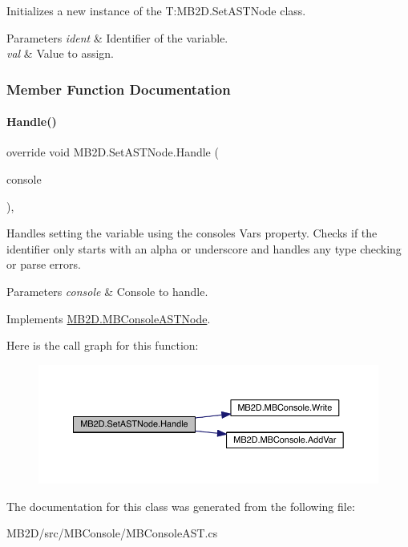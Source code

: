 Initializes a new instance of the T\+:\+M\+B2\+D.\+Set\+A\+S\+T\+Node class. 


\begin{DoxyParams}{Parameters}
{\em ident} & Identifier of the variable.\\
\hline
{\em val} & Value to assign.\\
\hline
\end{DoxyParams}


\subsubsection{Member Function Documentation}
\hypertarget{class_m_b2_d_1_1_set_a_s_t_node_a54eba248a545f6182c6a5509c4c1a6f2}{}\label{class_m_b2_d_1_1_set_a_s_t_node_a54eba248a545f6182c6a5509c4c1a6f2} 
\paragraph{\texorpdfstring{Handle()}{Handle()}}
{\footnotesize\ttfamily override void M\+B2\+D.\+Set\+A\+S\+T\+Node.\+Handle (\begin{DoxyParamCaption}\item[{\hyperlink{class_m_b2_d_1_1_m_b_console}{M\+B\+Console}}]{console }\end{DoxyParamCaption})\hspace{0.3cm}{\ttfamily [inline]}, {\ttfamily [virtual]}}



Handles setting the variable using the consoles Vars property. Checks if the identifier only starts with an alpha or underscore and handles any type checking or parse errors. 


\begin{DoxyParams}{Parameters}
{\em console} & Console to handle.\\
\hline
\end{DoxyParams}


Implements \hyperlink{class_m_b2_d_1_1_m_b_console_a_s_t_node_aa70a49e61ab623698af4ed8fda4ebbf5}{M\+B2\+D.\+M\+B\+Console\+A\+S\+T\+Node}.

Here is the call graph for this function\+:
\nopagebreak
\begin{figure}[H]
\begin{center}
\leavevmode
\includegraphics[width=350pt]{class_m_b2_d_1_1_set_a_s_t_node_a54eba248a545f6182c6a5509c4c1a6f2_cgraph}
\end{center}
\end{figure}


The documentation for this class was generated from the following file\+:\begin{DoxyCompactItemize}
\item 
M\+B2\+D/src/\+M\+B\+Console/M\+B\+Console\+A\+S\+T.\+cs\end{DoxyCompactItemize}
